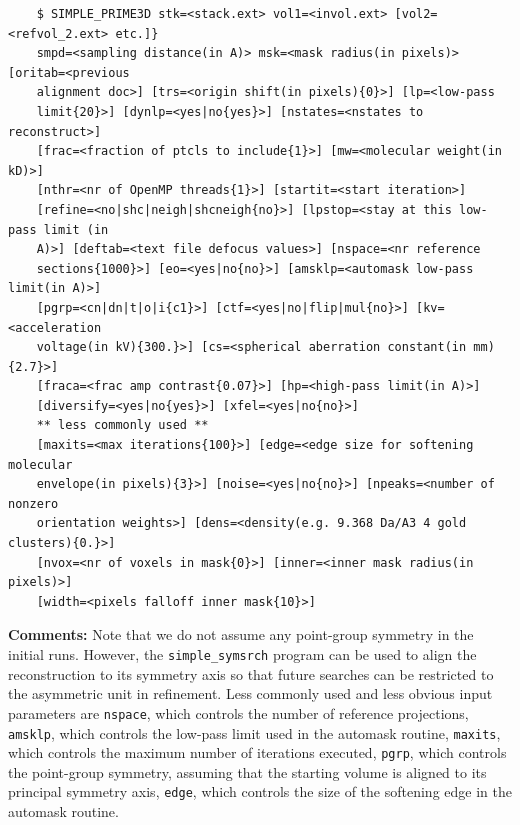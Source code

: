 \documentclass[a4paper,11pt]{article}
\newcommand{\prgname}[1]{\textcolor{NavyBlue}{\texttt{#1}}}
\begin{document}
\begin{verbatim}
    $ SIMPLE_PRIME3D stk=<stack.ext> vol1=<invol.ext> [vol2=<refvol_2.ext> etc.]}
    smpd=<sampling distance(in A)> msk=<mask radius(in pixels)> [oritab=<previous
    alignment doc>] [trs=<origin shift(in pixels){0}>] [lp=<low-pass
    limit{20}>] [dynlp=<yes|no{yes}>] [nstates=<nstates to reconstruct>]
    [frac=<fraction of ptcls to include{1}>] [mw=<molecular weight(in kD)>]
    [nthr=<nr of OpenMP threads{1}>] [startit=<start iteration>]
    [refine=<no|shc|neigh|shcneigh{no}>] [lpstop=<stay at this low-pass limit (in
    A)>] [deftab=<text file defocus values>] [nspace=<nr reference
    sections{1000}>] [eo=<yes|no{no}>] [amsklp=<automask low-pass limit(in A)>]
    [pgrp=<cn|dn|t|o|i{c1}>] [ctf=<yes|no|flip|mul{no}>] [kv=<acceleration
    voltage(in kV){300.}>] [cs=<spherical aberration constant(in mm){2.7}>]
    [fraca=<frac amp contrast{0.07}>] [hp=<high-pass limit(in A)>]
    [diversify=<yes|no{yes}>] [xfel=<yes|no{no}>]
    ** less commonly used **
    [maxits=<max iterations{100}>] [edge=<edge size for softening molecular
    envelope(in pixels){3}>] [noise=<yes|no{no}>] [npeaks=<number of nonzero
    orientation weights>] [dens=<density(e.g. 9.368 Da/A3 4 gold clusters){0.}>]
    [nvox=<nr of voxels in mask{0}>] [inner=<inner mask radius(in pixels)>]
    [width=<pixels falloff inner mask{10}>]
\end{verbatim}
\noindent\textbf{Comments:} Note that we do not assume any point-group symmetry in the initial runs. However, the \prgname{simple\_symsrch} program can be used to align the reconstruction to its symmetry axis so that future searches can be restricted to the asymmetric unit in refinement. Less commonly used and less obvious input parameters are \texttt{nspace}, which  controls the number of reference projections, \texttt{amsklp}, which controls the low-pass limit used in the automask routine, \texttt{maxits}, which controls the maximum number of iterations executed, \texttt{pgrp}, which controls the point-group symmetry, assuming that the starting volume is aligned to its principal symmetry axis, \texttt{edge}, which controls the size of the softening edge in the automask routine.
\end{document}

